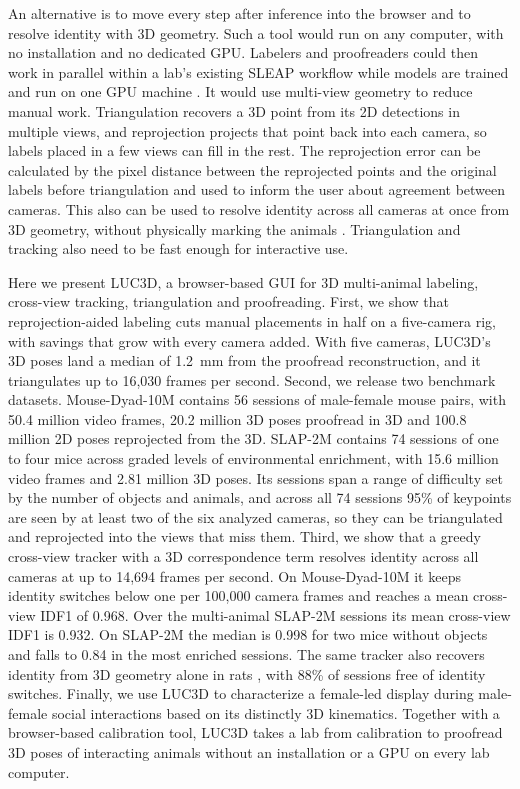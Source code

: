 \documentclass[pdflatex, sn-nature]{sn-jnl}
\theoremstyle{thmstyleone}%
\theoremstyle{thmstyletwo}%
\theoremstyle{thmstylethree}%
\begin{document}
An alternative is to move every step after inference into the browser and to resolve identity with 3D geometry. Such a tool would run on any computer, with no installation and no dedicated GPU. Labelers and proofreaders could then work in parallel within a lab's existing SLEAP workflow while models are trained and run on one GPU machine \citep{Pereira2022}. It would use multi-view geometry to reduce manual work. Triangulation recovers a 3D point from its 2D detections in multiple views, and reprojection projects that point back into each camera, so labels placed in a few views can fill in the rest. The reprojection error can be calculated by the pixel distance between the reprojected points and the original labels before triangulation and used to inform the user about agreement between cameras. This also can be used to resolve identity across all cameras at once from 3D geometry, without physically marking the animals \citep{Chen2020,Maree2024}. Triangulation and tracking also need to be fast enough for interactive use.

Here we present LUC3D, a browser-based GUI for 3D multi-animal labeling, cross-view tracking, triangulation and proofreading. First, we show that reprojection-aided labeling cuts manual placements in half on a five-camera rig, with savings that grow with every camera added. With five cameras, LUC3D's 3D poses land a median of 1.2~mm from the proofread reconstruction, and it triangulates up to 16,030 frames per second. Second, we release two benchmark datasets. Mouse-Dyad-10M contains 56 sessions of male-female mouse pairs, with 50.4 million video frames, 20.2 million 3D poses proofread in 3D and 100.8 million 2D poses reprojected from the 3D. SLAP-2M contains 74 sessions of one to four mice across graded levels of environmental enrichment, with 15.6 million video frames and 2.81 million 3D poses. Its sessions span a range of difficulty set by the number of objects and animals, and across all 74 sessions 95\% of keypoints are seen by at least two of the six analyzed cameras, so they can be triangulated and reprojected into the views that miss them. Third, we show that a greedy cross-view tracker with a 3D correspondence term resolves identity across all cameras at up to 14,694 frames per second. On Mouse-Dyad-10M it keeps identity switches below one per 100,000 camera frames and reaches a mean cross-view IDF1 of 0.968. Over the multi-animal SLAP-2M sessions its mean cross-view IDF1 is 0.932. On SLAP-2M the median is 0.998 for two mice without objects and falls to 0.84 in the most enriched sessions. The same tracker also recovers identity from 3D geometry alone in rats \citep{Klibaite2025}, with 88\% of sessions free of identity switches. Finally, we use LUC3D to characterize a female-led display during male-female social interactions based on its distinctly 3D kinematics. Together with a browser-based calibration tool, LUC3D takes a lab from calibration to proofread 3D poses of interacting animals without an installation or a GPU on every lab computer.
\end{document}
